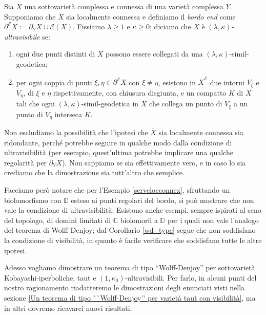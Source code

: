 \begin{defn} \label{ultravisibility}
    Sia $X$ una sottovarietà complessa e connessa di una varietà complessa $Y$. Supponiamo che $\overline{X}$ sia localmente connessa e definiamo il \textit{bordo end} come ${\partial^\mathcal{E}X:=\partial_YX\cup\mathcal{E}(X)}$. Fissiamo $\lambda \ge 1$ e $\kappa \ge 0$; diciamo che $X$ è \textit{$(\lambda,\kappa)$-ultravisibile} se:
    \begin{enumerate}
        \item ogni due punti distinti di $X$ possono essere collegati da una $(\lambda,\kappa)$-simil-geodetica;
        \item per ogni coppia di punti $\xi,\eta\in\partial^\mathcal{E}X$ con $\xi\not=\eta$, esistono in $\overline{X}^\mathcal{E}$ due intorni $V_\xi$ e $V_\eta$, di $\xi$ e $\eta$ rispettivamente, con chiusura disgiunta, e un compatto $K$ di $X$ tali che  ogni $(\lambda,\kappa)$-simil-geodetica in $X$ che collega un punto di $V_\xi$ a un punto di $V_\eta$ interseca $K$.
    \end{enumerate}
\end{defn}

\begin{oss}
    Non escludiamo la possibilità che l'ipotesi che $\overline{X}$ sia localmente connessa sia ridondante, perché potrebbe seguire in qualche modo dalla condizione di ultravisibilità (per esempio, quest'ultima potrebbe implicare una qualche regolarità per $\partial_YX$). Non sappiamo se sia effettivamente vero, e in caso lo sia crediamo che la dimostrazione sia tutt'altro che semplice.
    
    Facciamo però notare che per l'Esempio \ref{servelocconnex}, sfruttando un biolomorfismo con $\mathbb{D}$ esteso ai punti regolari del bordo, si può mostrare che non vale la condizione di ultravisibilità. Esistono anche esempi, sempre ispirati al seno del topologo, di domini limitati di $\mathbb{C}$ biolomorfi a $\mathbb{D}$ per i quali non vale l'analogo del teorema di Wolff-Denjoy; dal Corollario \ref{wd_type} segue che non soddisfano la condizione di visibilità, in quanto è facile verificare che soddisfano tutte le altre ipotesi.
\end{oss}

Adesso vogliamo dimostrare un teorema di tipo ``Wolff-Denjoy'' per sottovarietà Kobayashi-iperboliche, taut e $(1,\kappa_0)$-ultravisibili. Per farlo, in alcuni punti del nostro ragionamento riadatteremo le dimostrazioni degli enunciati visti nella sezione \ref{Un teorema di tipo ``Wolff-Denjoy'' per varietà taut con visibilità}, ma in altri dovremo ricavarci nuovi risultati.


